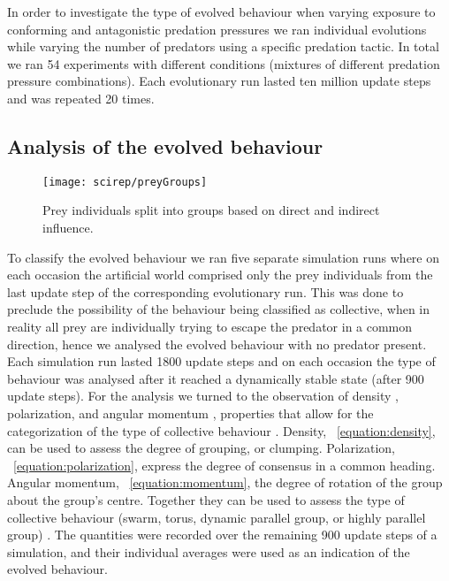 In order to investigate the type of evolved behaviour when varying exposure to conforming and antagonistic predation pressures we ran individual evolutions while varying the number of predators using a specific predation tactic. In total we ran 54 experiments with different conditions (mixtures of different predation pressure combinations). Each evolutionary run lasted ten million update steps and was repeated 20 times.

\subsection{Analysis of the evolved behaviour}

\begin{figure}
  \texttt{[image: scirep/preyGroups]}
  \caption{Prey individuals split into groups based on direct and indirect influence.}
  \label{figure:groups}
\end{figure}

To classify the evolved behaviour we ran five separate simulation runs where on each occasion the artificial world comprised only the prey individuals from the last update step of the corresponding evolutionary run. This was done to preclude the possibility of the behaviour being classified as collective, when in reality all prey are individually trying to escape the predator in a common direction, hence we analysed the evolved behaviour with no predator present. Each simulation run lasted 1800 update steps and on each occasion the type of behaviour was analysed after it reached a dynamically stable state (\ie after 900 update steps). For the analysis we turned to the observation of density \cite{olson2016evolution}, polarization, and angular momentum \cite{couzin2002collective}, properties that allow for the categorization of the type of collective behaviour \cite{couzin2002collective,olson2016evolution,tunstrom2013collective,vicsek2012collective,wood2007evolving}. Density, \eq~\eqref{equation:density}, can be used to assess the degree of grouping, or clumping. Polarization, \eq~\eqref{equation:polarization}, express the degree of consensus in a common heading. Angular momentum, \eq~\eqref{equation:momentum}, the degree of rotation of the group about the group's centre. Together they can be used to assess the type of collective behaviour (\ie swarm, torus, dynamic parallel group, or highly parallel group) \cite{couzin2002collective}. The quantities were recorded over the remaining 900 update steps of a simulation, and their individual averages were used as an indication of the evolved behaviour.

